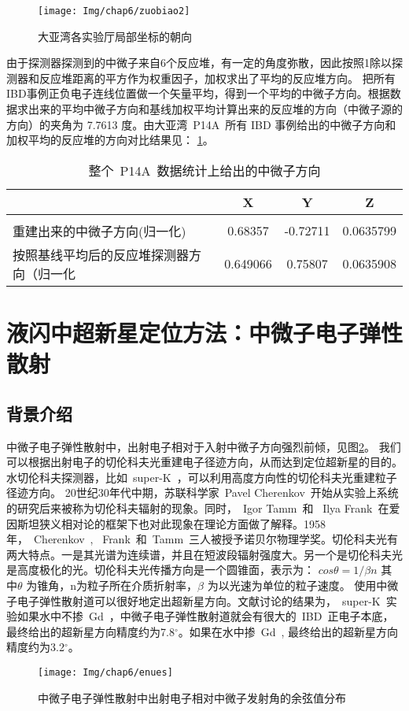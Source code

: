 \begin{figure}[!htb]
  \centering
   \texttt{[image: Img/chap6/zuobiao2]}
    \caption{大亚湾各实验厅局部坐标的朝向}
  \label{fig:ehangu}
\end{figure}

由于探测器探测到的中微子来自6个反应堆，有一定的角度弥散，因此按照1除以探测器和反应堆距离的平方作为权重因子，加权求出了平均的反应堆方向。 把所有IBD事例正负电子连线位置做一个矢量平均，得到一个平均的中微子方向。根据数据求出来的平均中微子方向和基线加权平均计算出来的反应堆的方向（中微子源的方向）的夹角为 7.7613 度。由大亚湾~P14A~所有 IBD 事例给出的中微子方向和加权平均的反应堆的方向对比结果见：
\ref{tab:t64}。
\begin{table}[htbp]
\centering  %
\begin{tabular}{lccc}  %
\hline
&X &Y&Z\\\hline
\\重建出来的中微子方向(归一化)&0.68357 & -0.72711&0.0635799
\\按照基线平均后的反应堆探测器方向（归一化&0.649066&0.75807&0.0635908
\\ \hline
\end{tabular}
\caption{整个~P14A~数据统计上给出的中微子方向}
\label{tab:t64}
\end{table}
\section{液闪中超新星定位方法：中微子电子弹性散射}
\subsection{背景介绍}
中微子电子弹性散射中，出射电子相对于入射中微子方向强烈前倾，见图\ref{fig:enues}。 我们可以根据出射电子的切伦科夫光重建电子径迹方向，从而达到定位超新星的目的。水切伦科夫探测器，比如~super-K~，可以利用高度方向性的切伦科夫光重建粒子径迹方向。
20世纪30年代中期，苏联科学家~Pavel Cherenkov~开始从实验上系统的研究后来被称为切伦科夫辐射的现象。同时，~Igor Tamm~和 ~Ilya Frank~在爱因斯坦狭义相对论的框架下也对此现象在理论方面做了解释。1958年，~Cherenkov~, ~Frank~和~Tamm~三人被授予诺贝尔物理学奖。切伦科夫光有两大特点。一是其光谱为连续谱，并且在短波段辐射强度大。另一个是切伦科夫光是高度极化的光。切伦科夫光传播方向是一个圆锥面，表示为：
$cos\theta = 1/ \beta n $
其中$\theta$ 为锥角，n为粒子所在介质折射率，$\beta$ 为以光速为单位的粒子速度。
使用中微子电子弹性散射道可以很好地定出超新星方向。文献\citep{tomas2003supernova}讨论的结果为，~super-K~实验如果水中不掺~Gd~，中微子电子弹性散射道就会有很大的~IBD~正电子本底，最终给出的超新星方向精度约为7.8$ ^\circ $。如果在水中掺~Gd~, 最终给出的超新星方向精度约为3.2$^\circ$。
\begin{figure}[!htb]
  \centering
   \texttt{[image: Img/chap6/enues]}
    \caption{中微子电子弹性散射中出射电子相对中微子发射角的余弦值分布}
  \label{fig:enues}
\end{figure}

